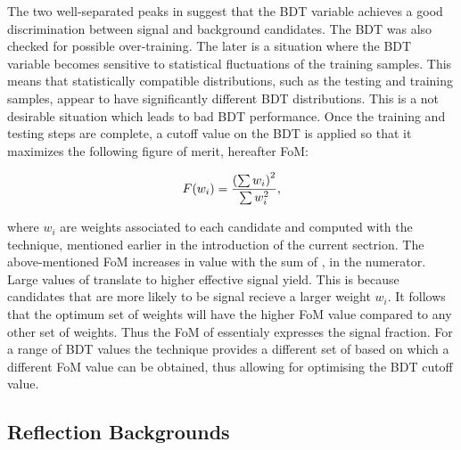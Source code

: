 The two well-separated peaks in  suggest that the BDT variable achieves a good
discrimination between signal and background candidates. The BDT was also checked for possible over-training.
The later is a situation where the BDT variable becomes sensitive to statistical fluctuations of the training samples.
This means that statistically compatible distributions, such as the testing and training samples,
appear to have significantly different BDT distributions. This is a not desirable situation which leads to
bad BDT performance. Once the training and testing steps are complete, a cutoff value on the BDT is applied
so that it maximizes the following figure of merit, hereafter FoM:

\begin{equation}
  \centering
  F(w_i) = \frac{\left(\sum{w_{i}}\right)^2}{\sum{w_{i}^2}},
\label{eqn:fom}
\end{equation}

\noindent where $w_i$ are weights associated to each candidate and computed with the \sPlot technique, 
mentioned earlier in the introduction of the current sectrion. The above-mentioned FoM increases in value with 
the sum of \sWeights, in the numerator. Large values of \sWeights translate to higher effective signal yield. 
This is because candidates that are more likely to be signal recieve a larger weight $w_i$. It follows that the
optimum set of weights will have the higher FoM value compared to any other set of weights. Thus the FoM
of  essentialy expresses the signal fraction. For a range of BDT values the \sPlot technique
provides a different set of \sWeights based on which a different FoM value can be obtained, thus allowing for
optimising the BDT cutoff value.

\subsection{Reflection Backgrounds}
\label{peaking_backgrounds}

